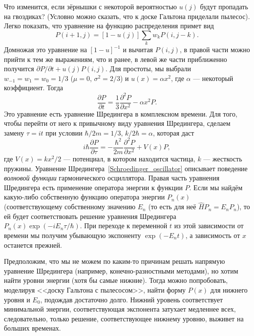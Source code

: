 \documentclass{book}
\begin{document}
Что изменится, если зёрнышки с некоторой вероятностью $u(j)$ будут пропадать на гвоздиках? (Условно
можно сказать, что к доске Гальтона приделали пылесос).  Легко показать, что уравнение на функцию
распределения примет вид
\begin{equation}
    P(i+1, j) = [1 - u(j)]\sum_k w_k P(i, j - k).
\end{equation}
Домножая это уравнение на $[1 - u]^{-1}$ и вычитая $P(i,j)$, в правой части можно прийти к тем же
выражениям, что и ранее, в левой же части приближенно получится $\partial P / \partial t + u(j)
P(i, j)$.
Для простоты, мы выбрали $w_{-1} = w_1 = w_0 = 1/3$ ($\mu = 0$, $\sigma^2 = 2/3$) и 
$u(x) = \alpha x^2$, где $\alpha$ --- некоторый коэффициент. Тогда
\begin{equation}
    \label{Feynman_board}
    \frac{\partial P}{\partial t} = \frac{1}{3} \frac{\partial^2 P}{\partial x^2} - \alpha
    x^2 P.
\end{equation}
Это уравнение есть уравнение Шредингера в комплексном времени. Для того, чтобы перейти от него к
привычному виду уравнения Шредингера, сделаем замену 
$\tau
= i t$ при условии $\hbar / 2 m = 1 / 3$, $k / 2 \hbar = \alpha$,
которая даст
\begin{equation}
    \label{Schroedinger_oscillator}
    i \hbar \frac{\partial P}{\partial \tau} = - \frac{\hbar^2}{2 m} \frac{\partial^2
    P}{\partial x^2} + V(x) P,
\end{equation}
где $V(x) = k x^2 / 2$ --- потенциал, в котором находится частица, $k$ --- жесткость пружины.
Уравнение Шредингера~\ref{Schroedinger_oscillator} описывает поведение \textit{волновой функции}
гармонического осциллятора. Правая часть уравнения Шредингера есть применение оператора энергии к
функции $P$. Если мы найдём какую-либо собственную функцию оператора энергии $P_n(x)$ (соответствующему
собственному значению $E_n$ (то есть для неё $\hat H P_n = E_n P_n$), то ей будет соответствовать
решение уравнения Шредингера $P_n(x) \exp(-i E_n \tau / \hbar)$. При переходе к переменной $t$ из
этой зависимости от времени мы
получим убывающую экспоненту $\exp(- E_n t)$, а зависимость от $x$ останется прежней.

Предположим, что мы не можем по каким-то причинам решать напрямую уравнение Шредингера (например,
конечно-разностными методами), но хотим найти уровни энергии (хотя бы самые нижние). Тогда можно
попробовать, моделируя <<доску Гальтона с пылесосом>>, найти форму $P(x)$ для нижнего уровня и $E_0$,
подождав достаточно долго. Нижний уровень соответствует минимальной энергии, соответствующая
экспонента затухает медленнее всех, следовательно, только решение, соответствующее нижнему уровню,
выживет на больших временах.
\end{document}
